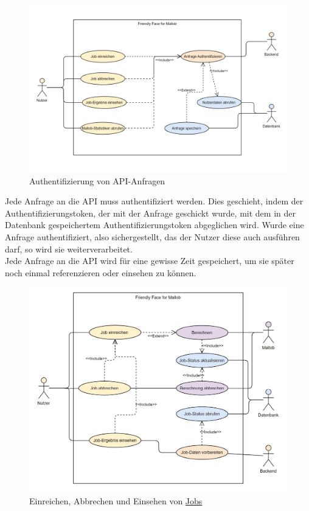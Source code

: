 \begin{figure}[H]
    \centering
    \includegraphics[width=\textwidth]{images-interface/Diagramme/Request_authntification_screenshot.jpg}
    \caption{Authentifizierung von \gls{API}-Anfragen}
\end{figure}
Jede Anfrage an die \gls{API} muss authentifiziert werden. Dies geschieht, indem der \gls{Authentifizierungstoken}, der mit der Anfrage geschickt wurde, mit dem in der \gls{Datenbank} gespeichertem \gls{Authentifizierungstoken} abgeglichen wird. Wurde eine Anfrage authentifiziert, also sichergestellt, das der \gls{Nutzer} diese auch ausführen darf, so wird sie weiterverarbeitet.\\
Jede Anfrage an die \gls{API} wird für eine gewisse Zeit gespeichert, um sie später noch einmal referenzieren oder einsehen zu können.

\pagebreak

\begin{figure}[H]
    \centering
    \includegraphics[width=\textwidth]{images-interface/Diagramme/Submit-abort-view-screenshot.jpg}
    \caption{Einreichen, Abbrechen und Einsehen von \hyperref[B:Jobs]{Jobs}}
\end{figure}

